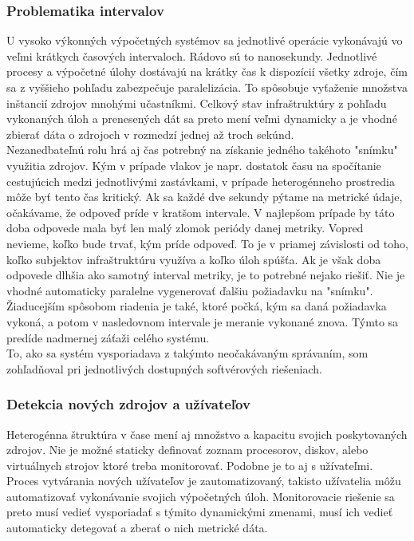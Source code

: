 \documentclass[11pt,final,oneside]{fithesis}
\begin{document}
\subsubsection{Problematika intervalov}
U vysoko výkonných výpočetných systémov sa jednotlivé operácie vykonávajú vo veľmi krátkych časových intervaloch. Rádovo sú to nanosekundy. Jednotlivé procesy a výpočetné úlohy dostávajú na krátky čas k dispozícií všetky zdroje, čím 
sa z vyššieho pohľadu zabezpečuje paralelizácia. To spôsobuje vyťaženie množstva inštancií zdrojov mnohými učastníkmi. Celkový stav infraštruktúry z pohľadu vykonaných úloh a prenesených dát sa preto mení veľmi dynamicky a je vhodné
zbierať dáta o zdrojoch v rozmedzí jednej až troch sekúnd. 
\\Nezanedbateľnú rolu hrá aj čas potrebný na získanie jedného takéhoto "snímku" využitia zdrojov. Kým v prípade vlakov je napr. dostatok času na spočítanie cestujúcich medzi jednotlivými zastávkami, v prípade heterogénneho prostredia 
môže byť tento čas kritický. Ak sa každé dve sekundy pýtame na metrické údaje, očakávame, že odpoveď príde v kratšom intervale. V najlepšom prípade by táto doba odpovede mala byť len malý zlomok periódy danej metriky. Vopred nevieme,
koľko bude trvať, kým príde odpoveď. To je v priamej závislosti od toho, koľko subjektov infraštruktúru využíva a koľko úloh spúšťa. Ak je však doba odpovede dlhšia ako samotný interval metriky, je to potrebné nejako riešiť. Nie je 
vhodné automaticky paralelne vygenerovať ďalšiu požiadavku na "snímku". Žiaducejším spôsobom riadenia je také, ktoré počká, kým sa daná požiadavka vykoná, a potom v nasledovnom intervale je meranie vykonané znova. Týmto sa predíde nadmernej záťaži
celého systému.
\\To, ako sa systém vysporiadava z takýmto neočakávaným správaním, som zohľadňoval pri jednotlivých dostupných softvérových riešeniach.

\subsubsection{Detekcia nových zdrojov a užívateľov}
Heterogénna štruktúra v čase mení aj množstvo a kapacitu svojich poskytovaných zdrojov. Nie je možné staticky definovať zoznam procesorov, diskov, alebo virtuálnych strojov ktoré treba monitorovať. Podobne je to aj s užívateľmi. Proces
vytvárania nových užívateľov je zautomatizovaný, takisto užívatelia môžu automatizovať vykonávanie svojich výpočetných úloh. Monitorovacie riešenie sa preto musí vedieť vysporiadať s týmito dynamickými zmenami, musí ich vedieť 
automaticky detegovať a zberať o nich metrické dáta.
\end{document}
